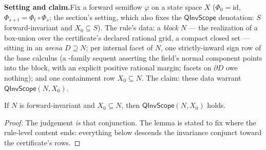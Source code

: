 

\textbf{Setting and claim.}\enspace Fix a forward semiflow $\varphi$ on
a state space $X$ ($\Phi_0 = \mathrm{id}$,
$\Phi_{s+t} = \Phi_t \circ \Phi_s$; the  section's
setting, which also fixes the $\mathsf{QInvScope}$ denotation: $S$
forward-invariant and $X_0 \subseteq S$). The rule's data: a
\emph{block} $N$ --- the realization of a box-union over the
certificate's declared rational grid, a compact closed set --- sitting
in an \emph{arena} $D \supseteq N$; per internal facet of $N$, one
strictly-inward sign row of the base calculus (a
-family sequent asserting the field's normal
component points into the block, with an explicit positive rational
margin; facets on $\partial D$ owe nothing); and one containment row
$X_0 \subseteq N$. The claim: these data warrant
$\mathsf{QInvScope}(N, X_0)$.

\begin{blemma}\label{lem:qbi-assembly}
If $N$ is forward-invariant and $X_0 \subseteq N$, then
$\mathsf{QInvScope}(N, X_0)$ holds.
\end{blemma}
\begin{proof}
The judgement \emph{is} that conjunction. The lemma is stated to fix
where the rule-level content ends: everything below descends the
invariance conjunct toward the certificate's rows.
\end{proof}

